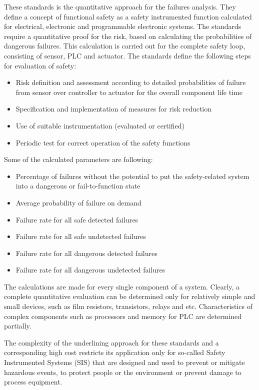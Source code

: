 These standards is the quantitative approach for the failures analysis.  
They define a concept of functional safety as a safety instrumented
function calculated for electrical, electronic and programmable electronic systems.
The standards require a quantitative proof for the risk, based on calculating
the probabilities of dangerous failures. This calculation is carried out for the
complete safety loop, consisting of sensor, PLC and actuator. The standards
define the following steps for evaluation of safety:
\begin{itemize}
  \item Risk definition and assessment according to detailed probabilities of
  failure from sensor over controller to actuator for the overall component life
  time 
  \item Specification and implementation of measures for risk reduction
  \item Use of suitable instrumentation (evaluated or certified) 
  \item Periodic test for correct operation of the safety functions
\end{itemize}
Some of the calculated parameters are following:
\begin{itemize}
  \item Percentage of failures without the potential to put the safety-related system into a dangerous 
or fail-to-function state
  \item Average probability of failure on demand
  \item Failure rate for all safe detected failures
  \item Failure rate for all safe undetected failures
  \item Failure rate for all dangerous detected failures
  \item Failure rate for all dangerous undetected failures
\end{itemize}
The calculations are made for every single component of a system. 
Clearly, a complete quantitative evaluation can be determined only for
relatively simple and small devices, such as film resistors, transistors, relays
and etc. Characteristics of complex components such as processors and memory for
PLC are determined partially.

The complexity of the underlining approach for these standards and a
corresponding high cost restricts its application only for so-called Safety
Instrumented Systems (SIS) that are designed and used to prevent or mitigate
hazardous events, to protect people or the environment or prevent damage to
process equipment.

